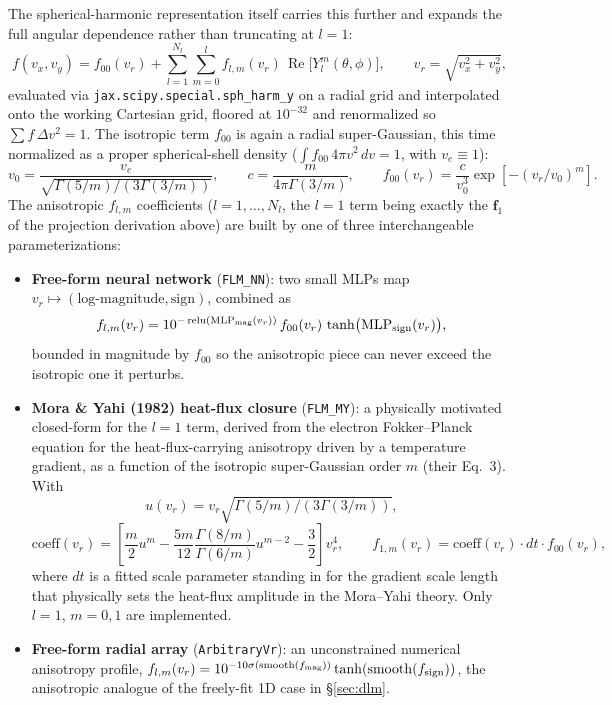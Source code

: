 \documentclass[11pt]{article}
\newcommand{\code}[1]{\texttt{#1}}
\begin{document}
The spherical-harmonic representation itself carries this further and expands the full
angular dependence rather than truncating at $l=1$:
\begin{equation}
  f(v_x,v_y) = f_{00}(v_r)+\sum_{l=1}^{N_l}\sum_{m=0}^{l}f_{l,m}(v_r)\,
  \operatorname{Re}\!\big[Y_l^m(\theta,\phi)\big], \qquad v_r=\sqrt{v_x^2+v_y^2},
\end{equation}
evaluated via \code{jax.scipy.special.sph\_harm\_y} on a radial grid and interpolated onto
the working Cartesian grid, floored at $10^{-32}$ and renormalized so $\sum f\,\Delta
v^2=1$. The isotropic term $f_{00}$ is again a radial super-Gaussian, this time normalized
as a proper spherical-shell density ($\int f_{00}\,4\pi v^2\,dv=1$, with $v_e\equiv1$):
\begin{equation}
  v_0=\frac{v_e}{\sqrt{\Gamma(5/m)/(3\Gamma(3/m))}}, \qquad c=\frac{m}{4\pi\Gamma(3/m)},
  \qquad f_{00}(v_r)=\frac{c}{v_0^3}\exp\!\left[-(v_r/v_0)^m\right].
\end{equation}
The anisotropic $f_{l,m}$ coefficients ($l=1,\ldots,N_l$, the $l=1$ term being exactly the
$\mathbf f_1$ of the projection derivation above) are built by one of three interchangeable
parameterizations:
\begin{itemize}
  \item \textbf{Free-form neural network} (\code{FLM\_NN}): two small MLPs map
    $v_r\mapsto(\text{log-magnitude},\text{sign})$, combined as
    \begin{equation}
      f_{l,m}(v_r) = 10^{-\operatorname{relu}(\mathrm{MLP}_{\rm mag}(v_r))}\,f_{00}(v_r)\,
      \tanh\!\big(\mathrm{MLP}_{\rm sign}(v_r)\big),
    \end{equation}
    bounded in magnitude by $f_{00}$ so the anisotropic piece can never exceed the
    isotropic one it perturbs.
  \item \textbf{Mora \& Yahi (1982) heat-flux closure} \cite{mora1982} (\code{FLM\_MY}): a physically
    motivated closed-form for the $l=1$ term, derived from the electron Fokker--Planck
    equation for the heat-flux-carrying anisotropy driven by a temperature gradient, as a
    function of the isotropic super-Gaussian order $m$ (their Eq.~3). With
    \begin{equation}
      u(v_r)=v_r\sqrt{\Gamma(5/m)/(3\Gamma(3/m))},
    \end{equation}
    \begin{equation}
      \mathrm{coeff}(v_r) = \left[\frac{m}{2}u^{m}
      -\frac{5m}{12}\frac{\Gamma(8/m)}{\Gamma(6/m)}u^{m-2}
      -\frac32\right]v_r^4, \qquad f_{1,m}(v_r)=\mathrm{coeff}(v_r)\cdot dt\cdot f_{00}(v_r),
    \end{equation}
    where $dt$ is a fitted scale parameter standing in for the gradient scale length that
    physically sets the heat-flux amplitude in the Mora--Yahi theory. Only $l=1$, $m=0,1$
    are implemented.
  \item \textbf{Free-form radial array} (\code{ArbitraryVr}): an unconstrained numerical
    anisotropy profile, $f_{l,m}(v_r)=10^{-10\sigma(\mathrm{smooth}(f_{\rm mag}))}
    \tanh(\mathrm{smooth}(f_{\rm sign}))$, the anisotropic analogue of the freely-fit 1D
    case in \S\ref{sec:dlm}.
\end{itemize}
\end{document}
